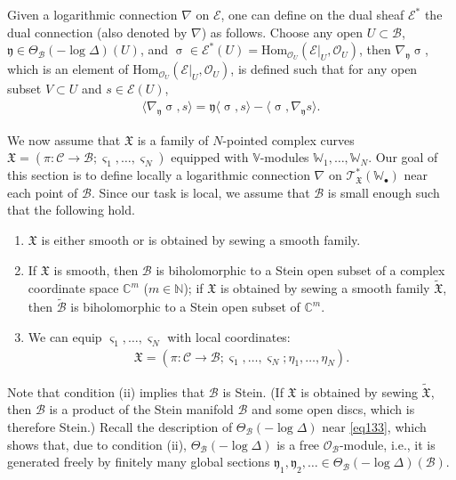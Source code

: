 \documentclass[12pt,a4paper,notitlepage]{report}
\theoremstyle{definition}
\theoremstyle{plain}
\newcommand{\fk}{\mathfrak}
\newcommand{\mc}{\mathcal}
\newcommand{\wtd}{\widetilde}
\newcommand{\Hom}{\mathrm{Hom}}
\newcommand{\bk}[1]{\langle {#1}\rangle}
\newcommand{\scr}{\mathscr}
\newcommand{\yk}{\mathfrak y}
\newcommand{\sgm}{\varsigma}
\newcommand{\blt}{\bullet}
\newcommand{\Vbb}{\mathbb V}
\newcommand{\Wbb}{\mathbb W}
\newcommand{\Cbb}{\mathbb C}
\newcommand{\Nbb}{\mathbb N}
\numberwithin{equation}{section}
\begin{document}
Given a logarithmic connection $\nabla$ on $\scr E$, one can define  on the dual sheaf $\scr E^*$ the dual connection (also denoted by $\nabla$) as follows. Choose any open $U\subset\mc B$, $\yk\in\Theta_{\mc B}(-\log\Delta)(U)$, and  $\upsigma\in\scr E^*(U)=\Hom_{\scr O_U}(\scr E|_U,\scr O_U)$, then $\nabla_{\yk}\upsigma$, which is an element of $\Hom_{\scr O_U}(\scr E|_U,\scr O_U)$, is defined such that for any open subset $V\subset U$ and $s\in\scr E(U)$,
\begin{align}
\bk{\nabla_{\yk}\upsigma,s}=\yk\bk{\upsigma,s}-\bk{\upsigma,\nabla_{\yk}s}.
\end{align}

We now assume that $\fk X$ is a family of $N$-pointed complex curves $\fk X=(\pi:\mc C\rightarrow\mc B;\sgm_1,\dots,\sgm_N)$ equipped with $\Vbb$-modules $\Wbb_1,\dots,\Wbb_N$. Our goal of this section is to define locally a logarithmic connection $\nabla$ on $\scr T_{\fk X}^*(\Wbb_\blt)$ near each point of $\mc B$. Since our task is local, we assume that $\mc B$ is small enough such that the following hold. 
\begin{enumerate}[label=(\roman*)]
\item $\fk X$ is either smooth or is obtained by sewing a smooth family.
\item If $\fk X$ is smooth,  then $\mc B$ is biholomorphic to a  Stein open subset of a complex coordinate space $\Cbb^m$  ($m\in\Nbb$); if $\fk X$ is obtained by sewing a smooth family $\wtd{\fk X}$, then  $\wtd{\mc B}$ is biholomorphic to a  Stein open subset of $\Cbb^m$.
\item We can equip $\sgm_1,\dots,\sgm_N$ with local coordinates:
\begin{align*}
\fk X=(\pi:\mc C\rightarrow\mc B;\sgm_1,\dots,\sgm_N;\eta_1,\dots,\eta_N).
\end{align*}
\end{enumerate}
Note that condition (ii) implies that $\mc B$ is Stein. (If $\fk X$ is obtained by sewing $\wtd{\fk X}$, then $\mc B$ is a product of the Stein manifold $\mc B$ and some open discs, which is therefore Stein.) Recall  the description of $\Theta_{\mc B}(-\log\Delta)$ near \eqref{eq133}, which shows that, due to condition (ii), $\Theta_{\mc B}(-\log\Delta)$ is a free $\scr O_{\mc B}$-module, i.e., it is generated freely by finitely many global sections $\fk y_1,\fk y_2,\dots\in \Theta_{\mc B}(-\log\Delta)(\mc B)$.
\end{document}
